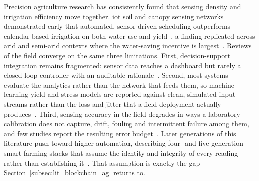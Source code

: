Precision agriculture research has consistently found that sensing density
and irrigation efficiency move together. \gls{iot} soil and canopy sensing
networks demonstrated early that automated, sensor-driven scheduling
outperforms calendar-based irrigation on both water use and
yield~\cite{rathi2025smart, brooks2019precisionWater, chatterjee2023precision, gondchawar2016agriculture4}, a finding replicated across arid and
semi-arid contexts where the water-saving incentive is
largest~\cite{williams2022savings, miller2020climateImpact, garrido2018mediterranean}. Reviews of the field converge on the same three
limitations. First, decision-support integration remains
fragmented: sensor data reaches a dashboard but rarely a closed-loop
controller with an auditable
rationale~\cite{aydin2021comprehensive, zhang2002precision, gebbers2010precision, mcbratney2005future}. Second, most systems evaluate
the analytics rather than the network that feeds them, so machine-learning
yield and stress models are reported against clean, simulated input streams
rather than the loss and jitter that a field deployment actually
produces~\cite{chlingaryan2018machine, goap2018iot, mohanty2016using, van2020review}. Third, sensing accuracy in the field degrades in ways a
laboratory calibration does not capture, drift, fouling and intermittent
failure among them, and few studies report the resulting error
budget~\cite{akhtar2019sensingAccuracy, agri2024sensorAccuracy, garcia2021sensorFailures, lopez2023remoteFailure}. Later generations of this
literature push toward higher automation, describing four- and
five-generation smart-farming stacks that assume the identity and integrity
of every reading rather than establishing
it~\cite{suleiman2025agriculture5, owusu2025iotAgri, yang2021iotSensing, singh2019iotSmartIrrigation, jin2025productivity}. That assumption is exactly
the gap Section~\ref{subsec:lit_blockchain_ag} returns to.

\label{subsec:lit_lpwan}

